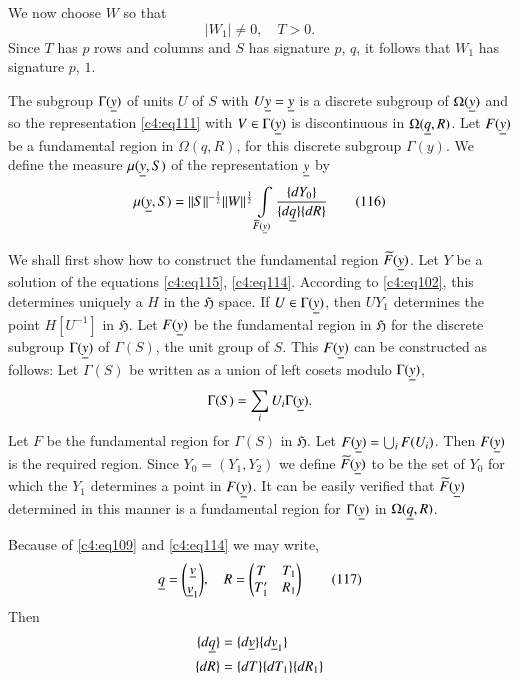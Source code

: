 We now choose $W$ so that 
\begin{equation*}
|W_{1}|\neq 0,\quad T>0.\tag{115}\label{c4:eq115}
\end{equation*}
Since $T$ has $p$ rows and columns and $S$ has signature $p$, $q$, it
follows that $W_{1}$ has signature $p$, $1$.

The subgroup $\Gamma(\underline{y})$ of units $U$ of $S$ with
$U\underline{y}=\underline{y}$ is a discrete subgroup of $\Omega(\underline{y})$ and so the
representation \eqref{c4:eq111} with $V\in\Gamma(\underline{y})$ is discontinuous
in $ \Omega (\underline{q},R)$. Let $F(\underline{y})$ be a fundamental region in
$\Omega(q,R)$, for this discrete subgroup $\Gamma(y)$. We define the
measure $\mu(\underline{y},S)$ of the representation $\underline{y}$ by 
\begin{equation*}
\mu(\underline{y},S)=||S||^{-\frac{1}{2}}||W||^{\frac{1}{2}}\int\limits_{\widetilde{F}(\underline{y})}\frac{\{dY_{0}\}}{\{d\underline{q}\}\{dR\}}\tag{116}\label{c4:eq116} 
\end{equation*}\pageoriginale

We shall first show how to construct the fundamental region
$\widetilde{F}(\underline{y})$. Let $Y$ be a solution of the equations
\eqref{c4:eq115}, \eqref{c4:eq114}. According to \eqref{c4:eq102}, this determines
uniquely a $H$ in the $\mathfrak{H}$ space. If $U\in \Gamma(\underline{y})$,
then $UY_{1}$ determines the point $H[U^{-1}]$ in $\mathfrak{H}$. Let
$F(\underline{y})$ be the fundamental region in $\mathfrak{H}$ for the
discrete subgroup $\Gamma(\underline{y})$ of $\Gamma(S)$, the unit group of
$S$. This $F(\underline{y})$ can be constructed as follows: Let $\Gamma(S)$
be written as a union of left cosets modulo $\Gamma(\underline{y})$,
$$
\Gamma(S)=\sum_{i}U_{i}\Gamma(\underline{y}).
$$
Let $F$ be the fundamental region for $\Gamma(S)$ in
$\mathfrak{H}$. Let $F(\underline{y})=\bigcup_{i} F(U_{i})$. Then
$F(\underline{y})$ is the required region. Since $Y_{0}=(Y_{1},Y_{2})$ we
define $\widetilde{F}(\underline{y})$ to be the set of $Y_{0}$ for which the
$Y_{1}$ determines a point in $F(\underline{y})$. It can be easily verified
that $\widetilde{F}(\underline{y})$ determined in this manner is a
fundamental region for $\Gamma(\underline{y})$ in $\Omega(\underline{q},R)$.

Because of \eqref{c4:eq109} and \eqref{c4:eq114} we may write,
\begin{equation*}
\underline{q}=\binom{\underline{v}}{\underline{v}_{1}},\quad
R=
\begin{pmatrix}
T & T_{1}\\
T'_{1} & R_{1}
\end{pmatrix}\tag{117}\label{c4:eq117}
\end{equation*}
Then 
\begin{align*}
\{d\underline{q}\} &= \{d\underline{v}\} \{d\underline{v}_{1}\}\\
\{dR\} &= \{dT\}\{dT_{1}\}\{dR_{1}\}
\end{align*}


